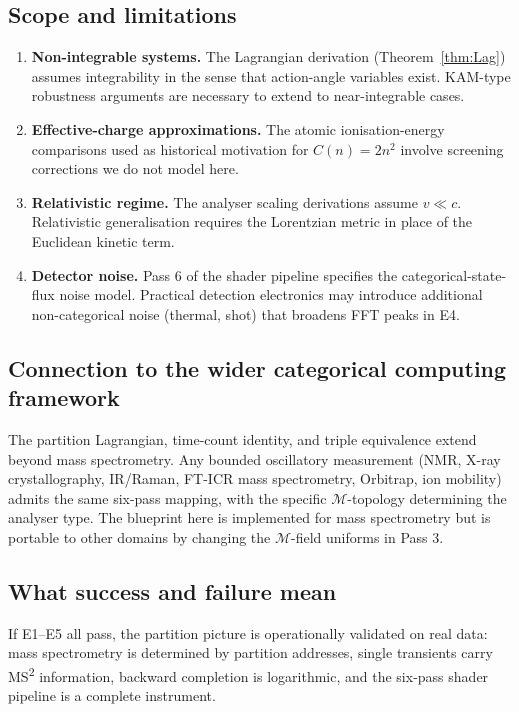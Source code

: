 \documentclass[twocolumn,10pt,a4paper]{article}
\theoremstyle{thmstyle}
\theoremstyle{definition}
\theoremstyle{remark}
\newcommand{\Depth}{\mathcal{M}}
\begin{document}
\subsection{Scope and limitations}

\begin{enumerate}[nosep,leftmargin=*]
\item \textbf{Non-integrable systems.} The Lagrangian derivation
(Theorem~\ref{thm:Lag}) assumes integrability in the sense that
action-angle variables exist. KAM-type robustness arguments are
necessary to extend to near-integrable cases.
\item \textbf{Effective-charge approximations.} The atomic
ionisation-energy comparisons used as historical motivation for
$C(n)=2n^{2}$ involve screening corrections we do not model here.
\item \textbf{Relativistic regime.} The analyser scaling derivations
assume $v\ll c$. Relativistic generalisation requires the
Lorentzian metric in place of the Euclidean kinetic term.
\item \textbf{Detector noise.} Pass 6 of the shader pipeline
specifies the categorical-state-flux noise model. Practical detection
electronics may introduce additional non-categorical noise (thermal,
shot) that broadens FFT peaks in E4.
\end{enumerate}

\subsection{Connection to the wider categorical computing framework}

The partition Lagrangian, time-count identity, and triple equivalence
extend beyond mass spectrometry. Any bounded oscillatory measurement
(NMR, X-ray crystallography, IR/Raman, FT-ICR mass spectrometry,
Orbitrap, ion mobility) admits the same six-pass mapping, with the
specific $\Depth$-topology determining the analyser type. The
blueprint here is implemented for mass spectrometry but is portable
to other domains by changing the $\Depth$-field uniforms in Pass 3.

\subsection{What success and failure mean}

If E1--E5 all pass, the partition picture is operationally validated
on real data: mass spectrometry is determined by partition addresses,
single transients carry MS\textsuperscript{2} information, backward
completion is logarithmic, and the six-pass shader pipeline is a
complete instrument.
\end{document}
